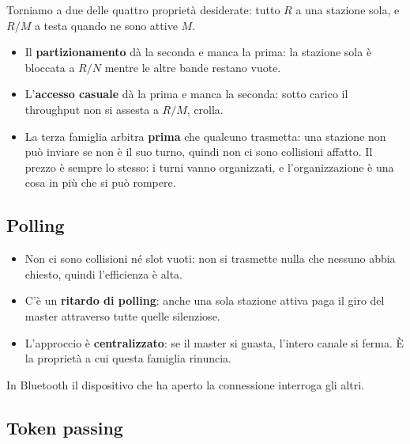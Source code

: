 Torniamo a due delle quattro proprietà desiderate: tutto $R$ a una stazione sola, e $R/M$ a testa quando ne sono attive $M$.

\begin{itemize}
    \item Il \textbf{partizionamento} dà la seconda e manca la prima: la stazione sola è bloccata a $R/N$ mentre le altre bande
          restano vuote.
    \item L'\textbf{accesso casuale} dà la prima e manca la seconda: sotto carico il throughput non si assesta a $R/M$, crolla.
    \item La terza famiglia arbitra \textbf{prima} che qualcuno trasmetta: una stazione non può inviare se non è il suo turno, quindi
          non ci sono collisioni affatto. Il prezzo è sempre lo stesso: i turni vanno organizzati, e l'organizzazione è una cosa in più
          che si può rompere.
\end{itemize}

\subsection{Polling}


\begin{itemize}
    \item[\itick] Non ci sono collisioni né slot vuoti: non si trasmette nulla che nessuno abbia chiesto, quindi l'efficienza è alta.
    \item[\icross] C'è un \textbf{ritardo di polling}: anche una sola stazione attiva paga il giro del master attraverso tutte quelle
          silenziose.
    \item[\icross] L'approccio è \textbf{centralizzato}: se il master si guasta, l'intero canale si ferma. È la proprietà a cui questa
          famiglia rinuncia.
\end{itemize}

In Bluetooth il dispositivo che ha aperto la connessione interroga gli altri.

\subsection{Token passing}

